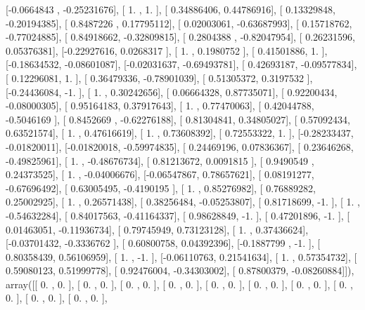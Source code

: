 \documentclass{article}
\begin{document}
       [-0.0664843 , -0.25231676],
       [ 1.        ,  1.        ],
       [ 0.34886406,  0.44786916],
       [ 0.13329848, -0.20194385],
       [ 0.8487226 ,  0.17795112],
       [ 0.02003061, -0.63687993],
       [ 0.15718762, -0.77024885],
       [ 0.84918662, -0.32809815],
       [ 0.2804388 , -0.82047954],
       [ 0.26231596,  0.05376381],
       [-0.22927616,  0.0268317 ],
       [ 1.        ,  0.1980752 ],
       [ 0.41501886,  1.        ],
       [-0.18634532, -0.08601087],
       [-0.02031637, -0.69493781],
       [ 0.42693187, -0.09577834],
       [ 0.12296081,  1.        ],
       [ 0.36479336, -0.78901039],
       [ 0.51305372,  0.3197532 ],
       [-0.24436084, -1.        ],
       [ 1.        ,  0.30242656],
       [ 0.06664328,  0.87735071],
       [ 0.92200434, -0.08000305],
       [ 0.95164183,  0.37917643],
       [ 1.        ,  0.77470063],
       [ 0.42044788, -0.5046169 ],
       [ 0.8452669 , -0.62276188],
       [ 0.81304841,  0.34805027],
       [ 0.57092434,  0.63521574],
       [ 1.        ,  0.47616619],
       [ 1.        ,  0.73608392],
       [ 0.72553322,  1.        ],
       [-0.28233437, -0.01820011],
       [-0.01820018, -0.59974835],
       [ 0.24469196,  0.07836367],
       [ 0.23646268, -0.49825961],
       [ 1.        , -0.48676734],
       [ 0.81213672,  0.0091815 ],
       [ 0.9490549 ,  0.24373525],
       [ 1.        , -0.04006676],
       [-0.06547867,  0.78657621],
       [ 0.08191277, -0.67696492],
       [ 0.63005495, -0.4190195 ],
       [ 1.        ,  0.85276982],
       [ 0.76889282,  0.25002925],
       [ 1.        ,  0.26571438],
       [ 0.38256484, -0.05253807],
       [ 0.81718699, -1.        ],
       [ 1.        , -0.54632284],
       [ 0.84017563, -0.41164337],
       [ 0.98628849, -1.        ],
       [ 0.47201896, -1.        ],
       [ 0.01463051, -0.11936734],
       [ 0.79745949,  0.73123128],
       [ 1.        ,  0.37436624],
       [-0.03701432, -0.3336762 ],
       [ 0.60800758,  0.04392396],
       [-0.1887799 , -1.        ],
       [ 0.80358439,  0.56106959],
       [ 1.        , -1.        ],
       [-0.06110763,  0.21541634],
       [ 1.        ,  0.57354732],
       [ 0.59080123,  0.51999778],
       [ 0.92476004, -0.34303002],
       [ 0.87800379, -0.08260884]]), array([[ 0.        ,  0.        ],
       [ 0.        ,  0.        ],
       [ 0.        ,  0.        ],
       [ 0.        ,  0.        ],
       [ 0.        ,  0.        ],
       [ 0.        ,  0.        ],
       [ 0.        ,  0.        ],
       [ 0.        ,  0.        ],
       [ 0.        ,  0.        ],
       [ 0.        ,  0.        ],
\end{document}
